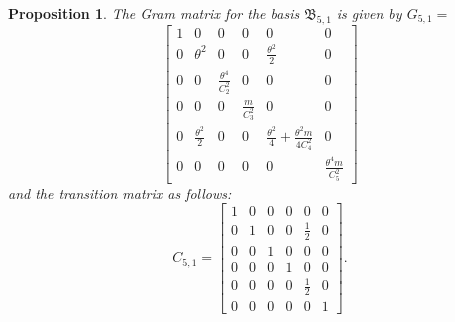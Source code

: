 \documentclass[table]{amsart}
\newtheorem{proposition}[theorem]{Proposition}
\numberwithin{equation}{section}
\begin{document}
\begin{proposition}
    The Gram matrix for the basis $\mathfrak{B}_{5,1}$ is given by $G_{5,1}=$
    \[
\begin{bmatrix}
1 & 0 & 0 & 0 & 0 & 0 \\[8pt]

0 & \theta^2 & 0 & 0 & \tfrac{\theta^2}{2 } & 0 \\[8pt]

0 & 0 & \tfrac{\theta^4}{C_2^2} & 0 & 0 & 0 \\[8pt]

0 & 0 & 0 & \tfrac{m}{C_3^2} & 0 & 0 \\[8pt]

0 & \tfrac{\theta^2}{2 } & 0 & 0 
& \tfrac{\theta^2}{4 } + \tfrac{\theta^2 m}{4 C_4^2} & 0 \\[8pt]

0 & 0 & 0 & 0 & 0 & \tfrac{\theta^4 m}{C_5^2}
\end{bmatrix}
\] and the transition matrix  as follows: 
\[C_{5,1}=
\begin{bmatrix}
1 & 0 & 0 & 0 & 0   & 0 \\[8pt]
0 & 1 & 0 & 0 & \tfrac{1}{2} & 0 \\[8pt]
0 & 0 & 1 & 0 & 0   & 0 \\[8pt]
0 & 0 & 0 & 1 & 0   & 0 \\[8pt]
0 & 0 & 0 & 0 & \tfrac{1}{2} & 0 \\[8pt]
0 & 0 & 0 & 0 & 0   & 1
\end{bmatrix}.
\]
\end{proposition}
\end{document}
